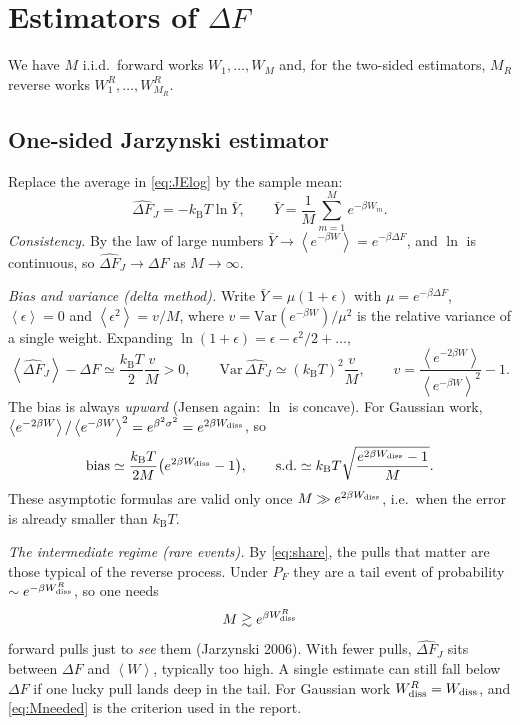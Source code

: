 \documentclass[11pt,a4paper]{article}
\newcommand{\kT}{k_{\mathrm B}T}
\newcommand{\avg}[1]{\left\langle #1\right\rangle}
\newcommand{\Wd}{W_{\rm diss}}
\newcommand{\dFJ}{\widehat{\Delta F}_J}
\begin{document}
\section{Estimators of $\Delta F$}
\label{sec:estimators}

We have $M$ i.i.d.\ forward works $W_1,\dots,W_M$ and, for the two-sided estimators, $M_R$ reverse
works $W^R_1,\dots,W^R_{M_R}$.

\subsection{One-sided Jarzynski estimator}
Replace the average in \eqref{eq:JElog} by the sample mean:
\begin{equation}
\dFJ=-\kT\ln\bar Y,\qquad \bar Y=\frac1M\sum_{m=1}^Me^{-\beta W_m}.
\end{equation}
\emph{Consistency.} By the law of large numbers $\bar Y\to\avg{e^{-\beta W}}=e^{-\beta\Delta F}$, and
$\ln$ is continuous, so $\dFJ\to\Delta F$ as $M\to\infty$.

\emph{Bias and variance (delta method).} Write $\bar Y=\mu(1+\epsilon)$ with
$\mu=e^{-\beta\Delta F}$, $\avg\epsilon=0$ and $\avg{\epsilon^2}=v/M$, where
$v=\mathrm{Var}(e^{-\beta W})/\mu^2$ is the relative variance of a single weight. Expanding
$\ln(1+\epsilon)=\epsilon-\epsilon^2/2+\dots$,
\begin{equation}
\avg{\dFJ}-\Delta F\simeq\frac{\kT}{2}\frac{v}{M}>0,\qquad
\mathrm{Var}\,\dFJ\simeq(\kT)^2\frac{v}{M},\qquad
v=\frac{\avg{e^{-2\beta W}}}{\avg{e^{-\beta W}}^2}-1 .
\label{eq:delta}
\end{equation}
The bias is always \emph{upward} (Jensen again: $\ln$ is concave). For Gaussian work,
$\avg{e^{-2\beta W}}/\avg{e^{-\beta W}}^2=e^{\beta^2\sigma^2}=e^{2\beta\Wd}$, so
\begin{equation}
\text{bias}\simeq\frac{\kT}{2M}\big(e^{2\beta\Wd}-1\big),\qquad
\text{s.d.}\simeq\kT\sqrt{\frac{e^{2\beta\Wd}-1}{M}}.
\end{equation}
These asymptotic formulas are valid only once $M\gg e^{2\beta\Wd}$, i.e.\ when the error is
already smaller than $\kT$.

\emph{The intermediate regime (rare events).} By \eqref{eq:share}, the pulls that matter are those
typical of the reverse process. Under $P_F$ they are a tail event of probability
$\sim e^{-\beta\Wd^R}$, so one needs
\begin{equation}
M\gtrsim e^{\beta\Wd^R}
\label{eq:Mneeded}
\end{equation}
forward pulls just to \emph{see} them (Jarzynski 2006). With fewer pulls, $\dFJ$ sits between
$\Delta F$ and $\avg W$, typically too high. A single estimate can still fall below $\Delta F$ if one
lucky pull lands deep in the tail. For Gaussian work $\Wd^R=\Wd$, and \eqref{eq:Mneeded} is the
criterion used in the report.
\end{document}
